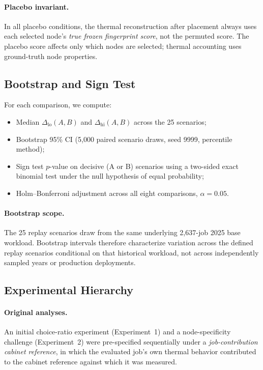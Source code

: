 \documentclass[acmsmall,screen,review,anonymous]{acmart}
\newcommand{\dlo}{\ensuremath{\Delta_{\mathrm{lo}}}\xspace}
\newcommand{\dhi}{\ensuremath{\Delta_{\mathrm{hi}}}\xspace}
\begin{document}
\paragraph{Placebo invariant.}
In all placebo conditions, the thermal reconstruction after placement always uses
each selected node's \emph{true frozen fingerprint score}, not the permuted score.
The placebo score affects only which nodes are selected; thermal accounting uses
ground-truth node properties.

\subsection{Bootstrap and Sign Test}

For each comparison, we compute:
\begin{itemize}
  \item Median $\dlo(A,B)$ and $\dhi(A,B)$ across the 25 scenarios;
  \item Bootstrap 95\% CI (5,000 paired scenario draws, seed 9999, percentile method);
  \item Sign test $p$-value on decisive (A or B) scenarios using a two-sided exact
    binomial test under the null hypothesis of equal probability;
  \item Holm--Bonferroni adjustment across all eight comparisons, $\alpha = 0.05$.
\end{itemize}

\paragraph{Bootstrap scope.}
The 25 replay scenarios draw from the same underlying 2,637-job 2025 base workload.
Bootstrap intervals therefore characterize variation across the defined replay scenarios
conditional on that historical workload, not across independently sampled years or
production deployments.

\subsection{Experimental Hierarchy}
\label{sec:hier}

\paragraph{Original analyses.}
An initial choice-ratio experiment (Experiment~1) and a node-specificity challenge
(Experiment~2) were pre-specified sequentially under a \emph{job-contribution cabinet
reference}, in which the evaluated job's own thermal behavior contributed to the cabinet
reference against which it was measured.
\end{document}
